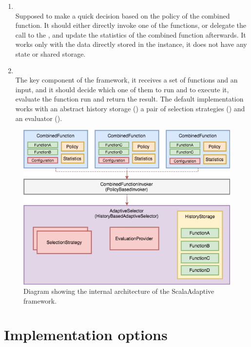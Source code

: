 \begin{enumerate}
	\item \textbf{} \\
	Supposed to make a quick decision based on the policy of the combined function. It should either directly invoke one of the functions, or delegate the call to the , and update the statistics of the combined function afterwards. It works only with the data directly stored in the  instance, it does not have any state or shared storage.
	\item \textbf{} \\
	The key component of the framework, it receives a set of functions and an input, and it should decide which one of them to run and to execute it, evaluate the function run and return the result. The default implementation works with an abstract history storage () a pair of selection strategies () and an evaluator ().
\end{enumerate}

\begin{figure}[h!]
	\captionsetup{justification=centering,margin=0.5cm}
	\centerline{\mbox{\includegraphics[width=140mm]{./img/internal_architecture.png}}}
	\caption{Diagram showing the internal architecture of the ScalaAdaptive framework.}
	\label{fig:internal_architecture}
\end{figure}

\section{Implementation options}

